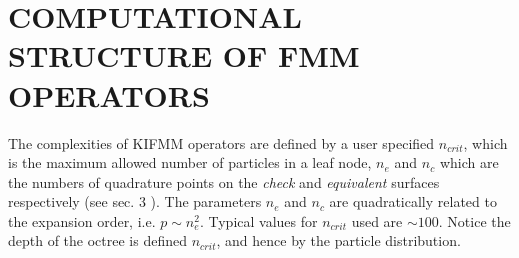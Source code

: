 \documentclass{IEEEcsmag}
\begin{document}


\section{COMPUTATIONAL STRUCTURE OF FMM OPERATORS}

The complexities of KIFMM operators are defined by a user specified $n_{crit}$, which is the maximum allowed number of particles in a leaf node, $n_e$ and $n_c$ which are the numbers of quadrature points on the \textit{check} and \textit{equivalent} surfaces respectively (see sec. 3 \cite{Ying2004}). The parameters $n_e$ and $n_c$ are quadratically related to the expansion order, i.e. $p \sim n_e^2$. Typical values for $n_{crit}$ used are $\sim 100$. Notice the depth of the octree is defined $n_{crit}$, and hence by the particle distribution. 
\end{document}
